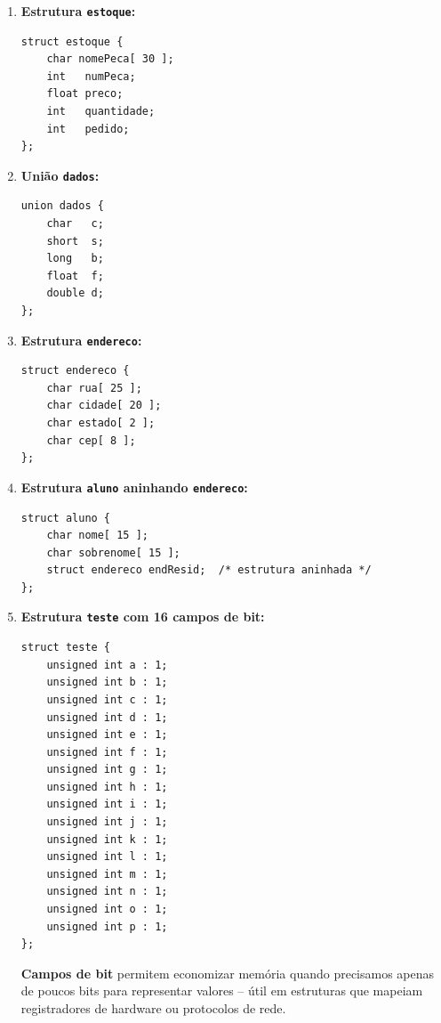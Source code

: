 \documentclass[12pt,a4paper]{article}
\begin{document}
\begin{respostabox}
\begin{enumerate}[label=\textbf{\alph*)}]

\item \textbf{Estrutura \texttt{estoque}:}
\begin{lstlisting}
struct estoque {
    char nomePeca[ 30 ];
    int   numPeca;
    float preco;
    int   quantidade;
    int   pedido;
};
\end{lstlisting}

\item \textbf{União \texttt{dados}:}
\begin{lstlisting}
union dados {
    char   c;
    short  s;
    long   b;
    float  f;
    double d;
};
\end{lstlisting}

\item \textbf{Estrutura \texttt{endereco}:}
\begin{lstlisting}
struct endereco {
    char rua[ 25 ];
    char cidade[ 20 ];
    char estado[ 2 ];
    char cep[ 8 ];
};
\end{lstlisting}

\item \textbf{Estrutura \texttt{aluno} aninhando \texttt{endereco}:}
\begin{lstlisting}
struct aluno {
    char nome[ 15 ];
    char sobrenome[ 15 ];
    struct endereco endResid;  /* estrutura aninhada */
};
\end{lstlisting}

\item \textbf{Estrutura \texttt{teste} com 16 campos de bit:}
\begin{lstlisting}
struct teste {
    unsigned int a : 1;
    unsigned int b : 1;
    unsigned int c : 1;
    unsigned int d : 1;
    unsigned int e : 1;
    unsigned int f : 1;
    unsigned int g : 1;
    unsigned int h : 1;
    unsigned int i : 1;
    unsigned int j : 1;
    unsigned int k : 1;
    unsigned int l : 1;
    unsigned int m : 1;
    unsigned int n : 1;
    unsigned int o : 1;
    unsigned int p : 1;
};
\end{lstlisting}

\textbf{Campos de bit} permitem economizar memória quando precisamos apenas de
poucos bits para representar valores -- útil em estruturas que mapeiam registradores
de hardware ou protocolos de rede.
\end{enumerate}
\end{respostabox}
\end{document}
